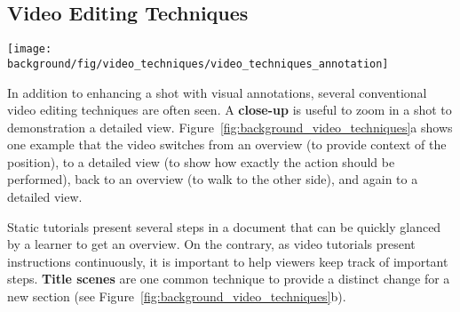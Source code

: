 


\subsection{Video Editing Techniques}

\begin{table*}[!htbp]
  \centering
  \texttt{[image: \\background/fig/video\_techniques/video\_techniques\_annotation]}
  \begin{minipage}{\textwidth}
  \caption[Example annotation techniques used in a video tutorial.]{
    Example annotation techniques used in a video tutorial\footnote{``How to use Loola 3 stroller'' by Maxi-Cosi, \url{https://youtu.be/p6MzLXeWBJw}, licensed under CC BY 2.0}.
  }
  \label{background_video_annotation_techniques}
  \end{minipage}
\end{table*}

In addition to enhancing a shot with visual annotations, several conventional video editing techniques are often seen. A \textbf{close-up} is useful to zoom in a shot to demonstration a detailed view. Figure~\ref{fig:background_video_techniques}a shows one example that the video switches from an overview (to provide context of the position), to a detailed view (to show how exactly the action should be performed), back to an overview (to walk to the other side), and again to a detailed view.

Static tutorials present several steps in a document that can be quickly glanced by a learner to get an overview. On the contrary, as video tutorials present instructions continuously, it is important to help viewers keep track of important steps. \textbf{Title scenes} are one common technique to provide a distinct change for a new section (see Figure~\ref{fig:background_video_techniques}b).

